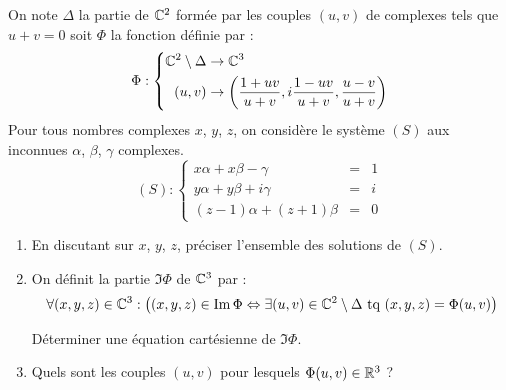 On note $\Delta$ la partie de $\mathbb{C}^2$ formée par les couples $(u,v)$ de complexes tels que $u+v=0$ soit $\Phi$ la fonction définie par :
\begin{displaymath}
\Phi :
\left\lbrace 
 \begin{aligned}
  \mathbb{C}^2 \setminus \Delta &\rightarrow  \mathbb{C}^3 \\
 (u,v) &\rightarrow \left(\frac{1+uv}{u+v}, i\frac{1-uv}{u+v}, \frac{u-v}{u+v} \right) 
 \end{aligned}\right. 
\end{displaymath}
Pour tous nombres complexes $x$, $y$, $z$, on considère le système $(S)$ aux inconnues  $\alpha$, $\beta$, $\gamma$ complexes.
\begin{displaymath}
 (S):
\left\lbrace 
\begin{aligned}
 x\alpha + x\beta - \gamma &=& 1\\
 y\alpha + y\beta + i\gamma &=& i\\
 (z-1)\alpha + (z+1)\beta &=& 0
\end{aligned}
\right. 
\end{displaymath}
\begin{enumerate}
 \item En discutant sur $x$, $y$, $z$, préciser l'ensemble des solutions de $(S)$.
 \item On définit la partie $\Im \Phi$ de $\mathbb{C}^3$ par :
\begin{displaymath}
 \forall (x,y,z)\in \mathbb{C}^3  : \left( 
(x,y,z)\in \operatorname{Im} \Phi \Leftrightarrow \exists(u,v)\in \mathbb{C}^2\setminus \Delta \text{ tq } (x,y,z)=\Phi(u,v) \right) 
\end{displaymath}

Déterminer une équation cartésienne de $\Im \Phi$.
\item Quels sont les couples $(u,v)$ pour lesquels $\Phi(u,v)\in\mathbb{R}^3$ ?
\end{enumerate}
